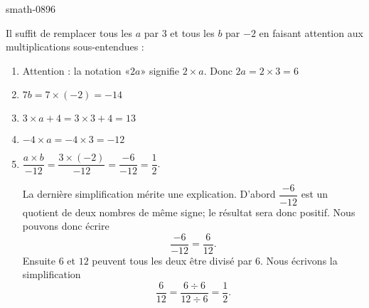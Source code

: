 
\begin{corrige}{smath-0896}

    Il suffit de remplacer tous les \( a\) par \( 3\) et tous les \( b\) par \( -2\) en faisant attention aux multiplications sous-entendues :
        \begin{enumerate}
            \item
                Attention : la notation «$2a$» signifie \( 2\times a\). Donc \( 2a=2\times 3=6\)
            \item
                \( 7b=7\times (-2)=-14\)
            \item
                \( 3\times a+4=3\times 3+4=13\)
            \item
                \(  -4\times a=-4\times 3=-12\)
            \item 
                \( \dfrac{ a\times b }{ -12 }=\dfrac{ 3\times (-2) }{ -12 }=\dfrac{ -6 }{ -12 }=\dfrac{ 1 }{2}\).

                La dernière simplification mérite une explication. D'abord \( \dfrac{ -6 }{ -12 }\) est un quotient de deux nombres de même signe; le résultat sera donc positif. Nous pouvons donc écrire
                \begin{equation}
                    \frac{ -6 }{ -12 }=\frac{ 6 }{ 12 }.
                \end{equation}
                Ensuite \( 6\) et \( 12\) peuvent tous les deux être divisé par \( 6\). Nous écrivons la simplification
                \begin{equation}
                    \frac{ 6 }{ 12 }=\frac{ 6\div 6 }{ 12\div 6 }=\frac{1}{ 2 }.
                \end{equation}
        \end{enumerate}

\end{corrige}
